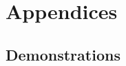 \documentclass[12pt, titlepage]{report}
\begin{document}

%  
  \chapter{Appendices}
  \section{Demonstrations}
  
  \printbibliography
\end{document}
